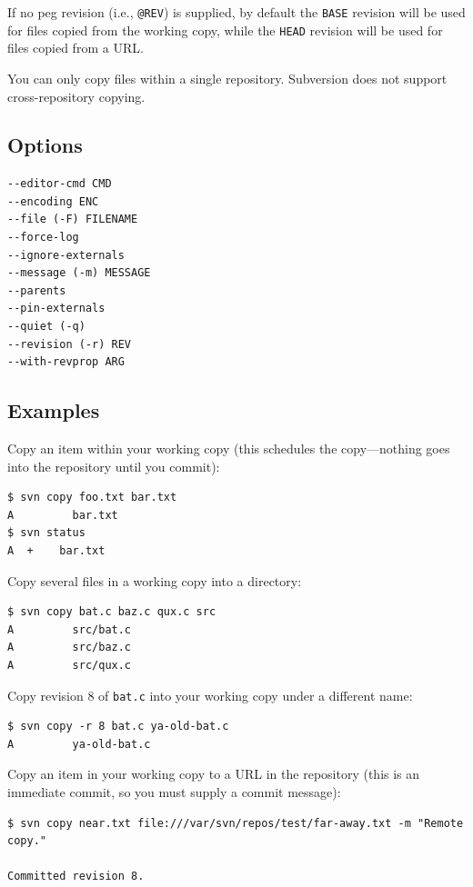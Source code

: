 If no peg revision (i.e., \texttt{@REV}) is supplied, by default the
\texttt{BASE} revision will be used for files copied from the working
copy, while the \texttt{HEAD} revision will be used for files copied
from a URL.

You can only copy files within a single repository. Subversion does not
support cross-repository copying.

\subsection{Options}

\begin{verbatim}
--editor-cmd CMD
--encoding ENC
--file (-F) FILENAME
--force-log
--ignore-externals
--message (-m) MESSAGE
--parents
--pin-externals
--quiet (-q)
--revision (-r) REV
--with-revprop ARG
\end{verbatim}

\subsection{Examples}

Copy an item within your working copy (this schedules the copy---nothing
goes into the repository until you commit):

\begin{verbatim}
$ svn copy foo.txt bar.txt
A         bar.txt
$ svn status
A  +    bar.txt
\end{verbatim}

Copy several files in a working copy into a directory:

\begin{verbatim}
$ svn copy bat.c baz.c qux.c src
A         src/bat.c
A         src/baz.c
A         src/qux.c
\end{verbatim}

Copy revision 8 of \texttt{bat.c} into your working copy under a
different name:

\begin{verbatim}
$ svn copy -r 8 bat.c ya-old-bat.c
A         ya-old-bat.c
\end{verbatim}

Copy an item in your working copy to a URL in the repository (this is an
immediate commit, so you must supply a commit message):

\begin{verbatim}
$ svn copy near.txt file:///var/svn/repos/test/far-away.txt -m "Remote copy."

Committed revision 8.
\end{verbatim}

